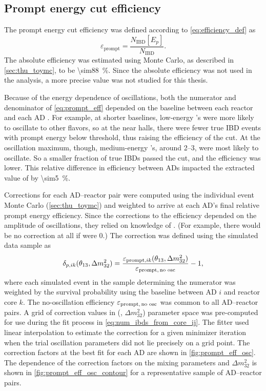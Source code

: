 \subsection{Prompt energy cut efficiency}
\label{subsec:eff_prompt}

The prompt energy cut efficiency was defined
according to \cref{eq:efficiency_def} as
\begin{equation}\label{eq:prompt_eff}
    \varepsilon_\text{prompt} = \frac{N_\text{IBD}[E_p]}{N_\text{IBD}}.
\end{equation}
The absolute efficiency was estimated using Monte Carlo,
as described in \cref{sec:thu_toymc}, to be \SI{\sim88}{\percent}.
Since the absolute efficiency was not used in the \thetaot{} analysis,
a more precise value was not studied for this thesis.

Because of the energy dependence of \nuebar{} oscillations,
both the numerator and denominator of \cref{eq:prompt_eff}
depended on the baseline between each reactor and each AD \cite{nh2016}.
For example, at shorter baselines, low-energy \nuebar{}'s
were more likely to oscillate to other flavors, so at the near halls,
there were fewer true IBD events with prompt energy below threshold,
thus raising the efficiency of the cut.
At the oscillation maximum, though, medium-energy \nuebar{}'s,
around \SIrange{2}{3}{\mev}, were most likely to oscillate.
So a smaller fraction of true IBDs passed the cut,
and the efficiency was lower.
This relative difference in efficiency between ADs
impacted the extracted value of \thetaot{} by \SI{\sim5}{\percent}.

Corrections for each AD--reactor pair were computed
using the individual event Monte Carlo (\cref{sec:thu_toymc})
and weighted to arrive at each AD's final relative prompt energy efficiency.
Since the corrections to the efficiency depended on
the amplitude of \nuebar{} oscillations, they relied on knowledge of \thetaot.
(For example, there would be no correction at all if \thetaot{} were $0$.)
The correction was defined using the simulated data sample as
\begin{equation}\label{eq:prompt_osc_correction}
    \delta_{p,ik}(\theta_{13}, \Delta m^2_{32}) =
    \frac{\varepsilon_{\text{prompt},ik}(\theta_{13}, \Delta m^2_{32})}{
        \varepsilon_{\text{prompt,\,no osc}}
    } - 1,
\end{equation}
where each simulated event in the sample determining the numerator
was weighted by the survival probability
using the baseline between AD $i$ and reactor core $k$.
The no-oscillation efficiency $\varepsilon_{\text{prompt,\,no osc}}$
was common to all AD--reactor pairs.
A grid of correction values in (\thetaot{}, $\Delta m^2_{32}$) parameter space
was pre-computed for use during the fit process
in \cref{eq:num_ibds_from_core_ij}.
The fitter used linear interpolation to estimate the correction for
a given minimizer iteration when the trial oscillation parameters
did not lie precisely on a grid point.
The correction factors at the best fit \thetaot{}
for each AD are shown in \cref{fig:prompt_eff_osc}.
The dependence of the correction factors
on the mixing parameters \thetaot{} and $\Delta m^2_{32}$
is shown in \cref{fig:prompt_eff_osc_contour}
for a representative sample of AD--reactor pairs.

